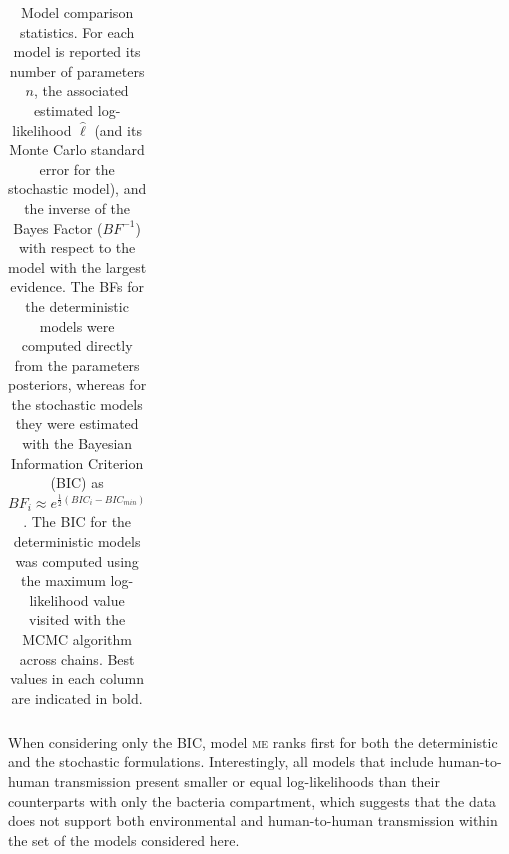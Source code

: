 \begin{table}[h!]
\begin{tabular}{lcccccccc}
   \bottomrule
\end{tabular}
\caption[Model comparison statistics.]{Model comparison statistics. For each model is reported its number of parameters $n$, the associated estimated log-likelihood $\hat{\ell}$ (and its Monte Carlo standard error for the stochastic model), and the inverse of the Bayes Factor ($BF^{-1}$) with respect to the model with the largest evidence. The BFs for the deterministic models were computed directly from the parameters posteriors, whereas for the stochastic models they were estimated with the Bayesian Information Criterion (BIC) as $BF_{i} \approx e^{\frac{1}{2} \left( BIC_i - BIC_{min}\right)}$. The BIC for the deterministic models was computed using the maximum log-likelihood value visited with the MCMC algorithm across chains. Best values in each column are indicated in bold.}\label{tab:stats}
\end{table}
When considering only the BIC, model \textsc{me} ranks first for both the deterministic and the stochastic formulations. Interestingly, all models that include human-to-human transmission present smaller or equal log-likelihoods than their counterparts with only the bacteria compartment, which suggests that the data does not support both environmental and human-to-human transmission within the set of the models considered here.

